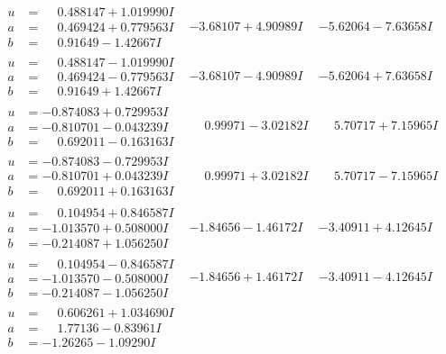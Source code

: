\documentclass[1p]{elsarticle_modified}
\theoremstyle{definition}
\begin{document}
$$\begin{array}{c|c|c}
\begin{aligned}
u &= \phantom{-}0.488147 + 1.019990 I \\
a &= \phantom{-}0.469424 + 0.779563 I \\
b &= \phantom{-}0.91649 - 1.42667 I\end{aligned}
 & -3.68107 + 4.90989 I & -5.62064 - 7.63658 I \\ \hline\begin{aligned}
u &= \phantom{-}0.488147 - 1.019990 I \\
a &= \phantom{-}0.469424 - 0.779563 I \\
b &= \phantom{-}0.91649 + 1.42667 I\end{aligned}
 & -3.68107 - 4.90989 I & -5.62064 + 7.63658 I \\ \hline\begin{aligned}
u &= -0.874083 + 0.729953 I \\
a &= -0.810701 - 0.043239 I \\
b &= \phantom{-}0.692011 - 0.163163 I\end{aligned}
 & \phantom{-}0.99971 - 3.02182 I & \phantom{-}5.70717 + 7.15965 I \\ \hline\begin{aligned}
u &= -0.874083 - 0.729953 I \\
a &= -0.810701 + 0.043239 I \\
b &= \phantom{-}0.692011 + 0.163163 I\end{aligned}
 & \phantom{-}0.99971 + 3.02182 I & \phantom{-}5.70717 - 7.15965 I \\ \hline\begin{aligned}
u &= \phantom{-}0.104954 + 0.846587 I \\
a &= -1.013570 + 0.508000 I \\
b &= -0.214087 + 1.056250 I\end{aligned}
 & -1.84656 - 1.46172 I & -3.40911 + 4.12645 I \\ \hline\begin{aligned}
u &= \phantom{-}0.104954 - 0.846587 I \\
a &= -1.013570 - 0.508000 I \\
b &= -0.214087 - 1.056250 I\end{aligned}
 & -1.84656 + 1.46172 I & -3.40911 - 4.12645 I \\ \hline\begin{aligned}
u &= \phantom{-}0.606261 + 1.034690 I \\
a &= \phantom{-}1.77136 - 0.83961 I \\
b &= -1.26265 - 1.09290 I\end{aligned}

\end{array}$$
\end{document}
